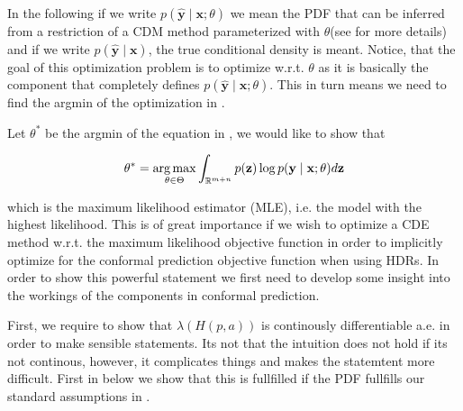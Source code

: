 In the following if we write $p(\mathbf{\hat{y}} \mid \mathbf{x}; \theta)$ we mean the PDF that can be inferred from a restriction of a CDM method parameterized with $\theta$(see  for more details) and if we write $p(\mathbf{\hat{y}} \mid \mathbf{x})$, the true conditional density is meant. Notice, that the goal of this optimization problem is to optimize w.r.t. $\theta$ as it is basically the component that completely defines $p(\mathbf{\hat{y}} \mid \mathbf{x}; \theta)$. This in turn means we need to find the argmin of the optimization in .

Let $\theta^*$ be the argmin of the equation in , we would like to show that

\begin{equation}
    \theta^* = \operatorname*{arg\,max}_{\theta \in \Theta}  \int_{\mathbb{R}^{m + n}}
    p(\mathbf{z}) \log p(\mathbf{y} \mid \mathbf{x}; \theta) d
    \mathbf{z}
\end{equation}

which is the maximum likelihood estimator (MLE), i.e. the model with the highest likelihood. This is of great importance if we wish to optimize a CDE method w.r.t. the maximum likelihood objective function in order to implicitly optimize for the conformal prediction objective function when using HDRs. In order to show this powerful statement we first need to develop some insight into the workings of the components in conformal prediction.

First, we require to show that $\lambda(H(p, a))$ is continously differentiable a.e. in order to make sensible statements. Its not that the intuition does not hold if its not continous, however, it complicates things and makes the statemtent more difficult. First in  below we show that this is fullfilled if the PDF fullfills our standard assumptions in .

